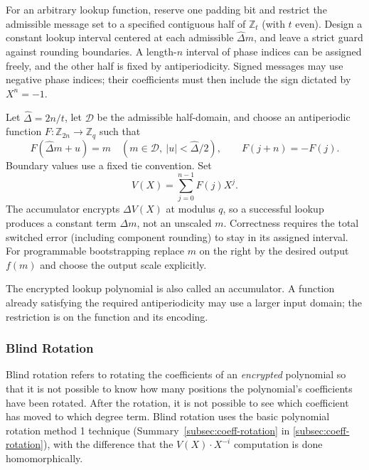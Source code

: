  For an arbitrary lookup function, reserve one padding bit and restrict the admissible message set to a specified contiguous half of $\mathbb Z_t$ (with $t$ even). Design a constant lookup interval centered at each admissible $\hat\Delta m$, and leave a strict guard against rounding boundaries. A length-$n$ interval of phase indices can be assigned freely, and the other half is fixed by antiperiodicity. Signed messages may use negative phase indices; their coefficients must then include the sign dictated by $X^n=-1$.

\begin{tcolorbox}[title={\textbf{\tboxlabel{\ref*{subsec:tfhe-zero-padding}} Structure of Lookup Table Polynomial $\bm{V(X)}$}}]
Let $\hat\Delta=2n/t$, let $\mathcal D$ be the admissible half-domain, and choose an antiperiodic function $F:\mathbb Z_{2n}\to\mathbb Z_q$ such that
\[
F(\hat\Delta m+u)=m\quad(m\in\mathcal D,\ |u|<\hat\Delta/2),\qquad F(j+n)=-F(j).
\]
Boundary values use a fixed tie convention. Set
\[
V(X)=\sum_{j=0}^{n-1}F(j)X^j.
\]
The accumulator encrypts $\Delta V(X)$ at modulus $q$, so a successful lookup produces a constant term $\Delta m$, not an unscaled $m$. Correctness requires the total switched error (including component rounding) to stay in its assigned interval. For programmable bootstrapping replace $m$ on the right by the desired output $f(m)$ and choose the output scale explicitly.
\end{tcolorbox}

The encrypted lookup polynomial is also called an accumulator. A function already satisfying the required antiperiodicity may use a larger input domain; the restriction is on the function and its encoding.

\subsubsection{Blind Rotation}
\label{subsec:bootstrapping-blind-rotation} 

Blind rotation refers to rotating the coefficients of an \textit{encrypted} polynomial so that it is not possible to know how many positions the polynomial's coefficients have been rotated. After the rotation, it is not possible to see which coefficient has moved to which degree term. Blind rotation uses the basic polynomial rotation method 1 technique (Summary~\ref*{subsec:coeff-rotation} in \autoref{subsec:coeff-rotation}), with the difference that the $V(X)\cdot X^{-i}$ computation is done homomorphically. 

